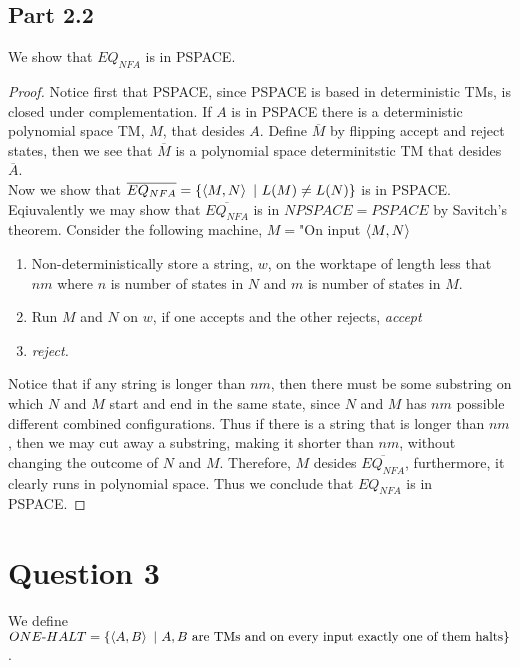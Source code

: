 \documentclass[a4paper,11pt]{article}
\newcommand{\pipe}{\ \vert \ }
\newcommand{\tm}{\text{-}}
\numberwithin{equation}{section}
\begin{document}
	\subsection*{Part 2.2}
	We show that $ EQ_{NFA} $ is in PSPACE.\begin{proof}
		Notice first that PSPACE, since PSPACE is based in deterministic TMs, is closed under complementation. If $ A $ is in PSPACE there is a deterministic polynomial space TM, $ M $, that desides $ A $. Define $ \overline{M} $ by flipping accept and reject states, then we see that $ \overline{M} $ is a polynomial space determinitstic TM that desides $ \overline{A} $.\\
		Now we show that $ \overline{EQ_{NFA}}=\{\braket{M,N}\pipe L(M) \neq L(N)\} $ is in PSPACE. Eqiuvalently we may show that $ \overline{EQ_{NFA}} $ is in $ NPSPACE=PSPACE $ by Savitch's theorem.
		Consider the following machine, $ M= $"On input $ \braket{M,N} $\begin{enumerate}
			\item Non-deterministically store a string, $ w $, on the worktape of length less that $ nm $ where $ n $ is number of states in $ N $ and $ m $ is number of states in $ M $.
			\item Run $ M $ and $ N $ on $ w $, if one accepts and the other rejects, \emph{accept}
			\item \emph{reject.}
		\end{enumerate}
		Notice that if any string is longer than $ nm $, then there must be some substring on which $ N $ and $ M $ start and end in the same state, since $ N $ and $ M $ has $ nm $ possible different combined configurations. Thus if there is a string that is longer than $ nm $, then we may cut away a substring, making it shorter than $ nm $, without changing the outcome of $ N $ and $ M $. Therefore, $ M $ desides $ \overline{EQ_{NFA}} $, furthermore, it clearly runs in polynomial space. Thus we conclude that $ EQ_{NFA} $ is in PSPACE.
	\end{proof}
	
	\section*{Question 3}
	We define $ ONE\tm HALT=\{\braket{A,B}\pipe A,B\text{ are TMs and on every input exactly one of them halts}\} $.
\end{document}
